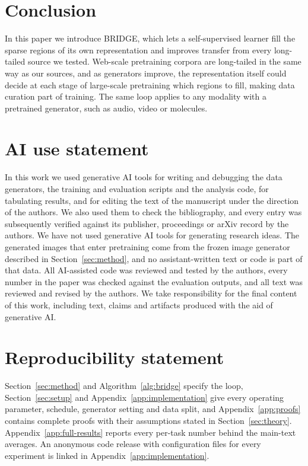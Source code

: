 \documentclass{article}
\newcommand{\method}{BRIDGE}
\begin{document}
\section{Conclusion}
In this paper we introduce \method, which lets a self-supervised learner fill the sparse regions of its own representation and improves transfer from every long-tailed source we tested. Web-scale pretraining corpora are long-tailed in the same way as our sources, and as generators improve, the representation itself could decide at each stage of large-scale pretraining which regions to fill, making data curation part of training. The same loop applies to any modality with a pretrained generator, such as audio, video or molecules.

\clearpage
\section*{AI use statement}
In this work we used generative AI tools for writing and debugging the data generators, the training
and evaluation scripts and the analysis code, for tabulating results, and
for editing the text of the manuscript under the direction of
the authors. We also used them to check the bibliography, and every entry
was subsequently verified against its publisher, proceedings or arXiv record by the authors. We have not used
generative AI tools for generating research ideas. The generated images
that enter pretraining come from the frozen image generator described in
Section~\ref{sec:method}, and no assistant-written text or code is part of
that data. All AI-assisted code was reviewed and
tested by the authors, every number in the paper was checked against the
evaluation outputs, and all text was reviewed and revised by the authors.
We take responsibility for the final content of this work, including text,
claims and artifacts produced with the aid of generative AI.

\section*{Reproducibility statement}
Section~\ref{sec:method} and Algorithm~\ref{alg:bridge} specify the loop, Section~\ref{sec:setup} and Appendix~\ref{app:implementation} give every operating parameter, schedule, generator setting and data split, and Appendix~\ref{app:proofs} contains complete proofs with their assumptions stated in Section~\ref{sec:theory}. Appendix~\ref{app:full-results} reports every per-task number behind the main-text averages. An anonymous code release with configuration files for every experiment is linked in Appendix~\ref{app:implementation}.
\end{document}

